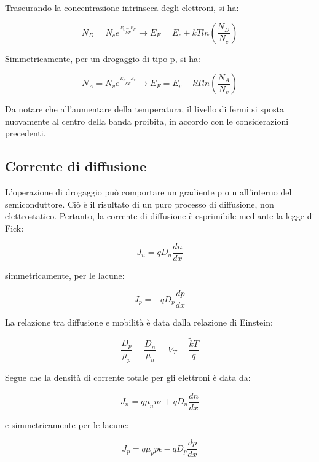 \documentclass{article}
\begin{document}
Trascurando la concentrazione intrinseca degli elettroni, si ha:

\begin{equation}
    N_D= N_c e^{\frac{E_c-E_F}{kT}} \rightarrow E_F = E_c + kT ln(\frac{N_D}{N_c})
\end{equation}

Simmetricamente, per un drogaggio di tipo p, si ha:

\begin{equation}
    N_A= N_v e^{\frac{E_F-E_v}{kT}} \rightarrow E_F = E_v - kT ln(\frac{N_A}{N_v})
\end{equation}

Da notare che all'aumentare della temperatura, il livello di fermi si sposta nuovamente al centro della banda proibita, in accordo con le considerazioni precedenti.

\subsection{Corrente di diffusione}

L'operazione di drogaggio può comportare un gradiente p o n all'interno del semiconduttore.
Ciò è il risultato di un puro processo di diffusione, non elettrostatico. Pertanto, la corrente di
diffusione è esprimibile mediante la legge di Fick:

\begin{equation}
    J_n = q D_n \frac{dn}{dx}
\end{equation}

simmetricamente, per le lacune:

\begin{equation}
    J_p = -q D_p \frac{dp}{dx}
\end{equation}

La relazione tra diffusione e mobilità è data dalla relazione di Einstein:

\begin{equation}
    \frac{D_p}{\mu_p} = \frac{D_n}{\mu_n} = V_T= \frac{\tilde{k}T}{q}
\end{equation}

Segue che la densità di corrente totale per gli elettroni è data da:

\begin{equation}
    J_n= q\mu_n n \epsilon+ qD_n \frac{dn}{dx}
\end{equation}

e simmetricamente per le lacune:

\begin{equation}
    J_p= q\mu_p p \epsilon- qD_p \frac{dp}{dx}
\end{equation}
\end{document}
